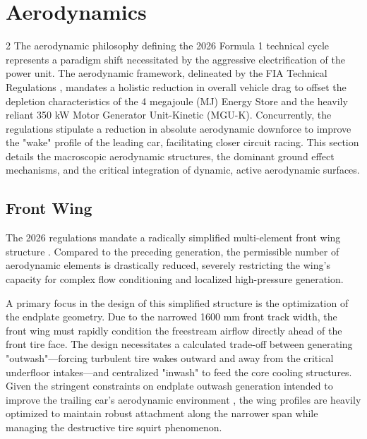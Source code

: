 \section{Aerodynamics}

\begin{multicols}{2}
The aerodynamic philosophy defining the 2026 Formula 1 technical cycle represents a paradigm shift necessitated by the aggressive electrification of the power unit. The aerodynamic framework, delineated by the FIA Technical Regulations \cite{FIA_2026_Chassis_Regulations}, mandates a holistic reduction in overall vehicle drag to offset the depletion characteristics of the 4 megajoule (MJ) Energy Store and the heavily reliant 350 kW Motor Generator Unit-Kinetic (MGU-K). Concurrently, the regulations stipulate a reduction in absolute aerodynamic downforce to improve the "wake" profile of the leading car, facilitating closer circuit racing. This section details the macroscopic aerodynamic structures, the dominant ground effect mechanisms, and the critical integration of dynamic, active aerodynamic surfaces.

\subsection{Front Wing}
The 2026 regulations mandate a radically simplified multi-element front wing structure \cite{FIA_2026_Technical_Regulations}. Compared to the preceding generation, the permissible number of aerodynamic elements is drastically reduced, severely restricting the wing's capacity for complex flow conditioning and localized high-pressure generation. 

A primary focus in the design of this simplified structure is the optimization of the endplate geometry. Due to the narrowed 1600 mm front track width, the front wing must rapidly condition the freestream airflow directly ahead of the front tire face. The design necessitates a calculated trade-off between generating "outwash"—forcing turbulent tire wakes outward and away from the critical underfloor intakes—and centralized "inwash" to feed the core cooling structures. Given the stringent constraints on endplate outwash generation intended to improve the trailing car's aerodynamic environment \cite{FIA_2026_Chassis_Regulations}, the wing profiles are heavily optimized to maintain robust attachment along the narrower span while managing the destructive tire squirt phenomenon.


\end{multicols}
